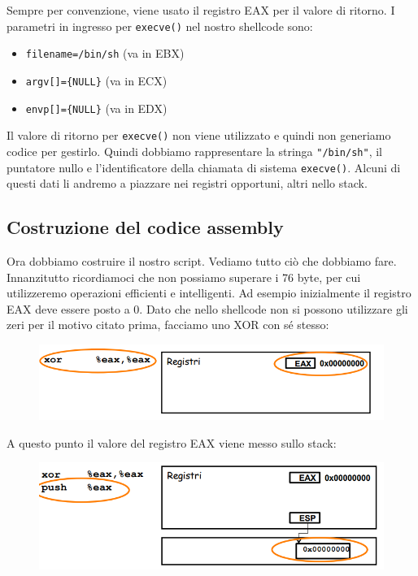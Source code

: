 Sempre per convenzione, viene usato il registro EAX per il valore di ritorno. I parametri in ingresso per \texttt{execve()} nel nostro shellcode sono:
\begin{itemize}
    \item \texttt{filename=/bin/sh} (va in EBX)
    \item \texttt{argv[]=\{NULL\}} (va in ECX)
    \item \texttt{envp[]=\{NULL\}} (va in EDX)
\end{itemize}
Il valore di ritorno per \texttt{execve()} non viene utilizzato e quindi non generiamo codice per gestirlo. Quindi dobbiamo rappresentare la stringa \texttt{"/bin/sh"}, il puntatore nullo e l'identificatore della chiamata di sistema \texttt{execve()}. Alcuni di questi dati li andremo a piazzare nei registri opportuni, altri nello stack.

\subsection{Costruzione del codice assembly}
Ora dobbiamo costruire il nostro script. Vediamo tutto ciò che dobbiamo fare. Innanzitutto ricordiamoci che non possiamo superare i 76 byte, per cui utilizzeremo operazioni efficienti e intelligenti. Ad esempio inizialmente il registro EAX deve essere posto a 0. Dato che nello shellcode non si possono utilizzare gli zeri per il motivo citato prima, facciamo uno XOR con sé stesso:

\begin{figure}[hbpt!]
    \centering
    \includegraphics[width= 0.5 \textwidth]{./Images/cap8/8.1.png}
\end{figure}
\FloatBarrier

A questo punto il valore del registro EAX viene messo sullo stack:

\begin{figure}[hbpt!]
    \centering
    \includegraphics[width= 0.5 \textwidth]{./Images/cap8/8.2.png}
\end{figure}
\FloatBarrier


